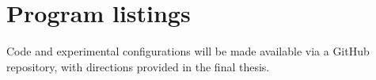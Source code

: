 \documentclass[12pt,openany,a4paper]{book}
\begin{document}
\newpage
{}
\mbox{}
\newpage



\chapter{Program listings}
Code and experimental configurations will be made available via a GitHub repository, with directions provided in the final thesis.
\end{document}
